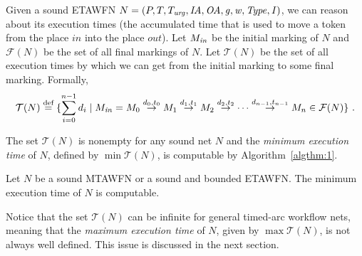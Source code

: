Given a sound ETAWFN $N=(P, T, T_{\mathit{urg}}, \mathit{IA},\allowbreak \mathit{OA}, \mathit{g}, \mathit{w}, \mathit{Type}, \mathit{I})$, we can reason about its
execution times (the accumulated time that is used to
move a token from the place $\mathit{in}$ into the place $\mathit{out}$).
Let $M_{{\mathit{in}}}$ be the initial marking of $N$ and
$\mathcal{F}(N)$ be the set of all final markings of $N$.
Let $\mathcal{T}(N)$ be the set of all execution times by which we can 
get from the initial marking to some final marking. Formally,
$$\mathcal{T}(N)\stackrel{\textrm{def}}{=} 
 \{ \sum_{i=0}^{n-1}{d_i} \mid
M_{{\mathit{in}}}= M_0 
\stackrel{d_0,t_0}{\rightarrow} M_1 \stackrel{d_1,t_1}{\rightarrow} M_2 \stackrel{d_2,t_2}{\rightarrow} \cdots 
\stackrel{d_{n-1},t_{n-1}}{\rightarrow} M_n \in \mathcal{F}(N) \} \ .$$

The set $\mathcal{T}(N)$ is nonempty for any sound net $N$
and the \emph{minimum execution time} of $N$, defined by $\min \mathcal{T}(N)$,
is computable by Algorithm~\ref{algthm:1}.

\begin{theorem}
Let $N$ be a sound MTAWFN or a sound and bounded ETAWFN.
The minimum execution time of $N$ is computable.
\end{theorem}

Notice that 
the set $\mathcal{T}(N)$ can be infinite for general timed-arc
workflow nets, meaning that the \emph{maximum
execution time} of $N$, given by $\max \mathcal{T}(N)$, is not
always well defined. This issue is discussed in the next section.
